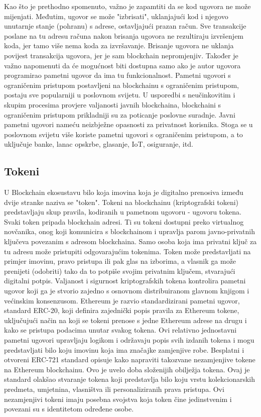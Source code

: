 \documentclass[times, utf8, diplomski]{fer}
\begin{document}
Kao što je prethodno spomenuto, važno je zapamtiti da se kod ugovora ne može mijenjati. Međutim, ugovor se može "izbrisati", uklanjajući kod i njegovo unutarnje stanje (pohranu) s adrese, ostavljajući prazan račun. Sve transakcije poslane na tu adresu računa nakon brisanja ugovora ne rezultiraju izvršenjem koda, jer tamo više nema koda za izvršavanje. Brisanje ugovora ne uklanja povijest transakcija ugovora,  jer je sam blockchain nepromjenjiv. Također je važno napomenuti da će mogućnost biti dostupna samo ako je autor ugovora programirao pametni ugovor da ima tu funkcionalnost.
Pametni ugovori s ograničenim pristupom postavljeni na blockchainu s ograničenim pristupom, postaju sve popularniji u poslovnom svijetu. U usporedbi s neučinkovitim i skupim procesima provjere valjanosti javnih blockchaina, blockchaini s ograničenim pristupom prikladniji su za poticanje poslovne suradnje. Javni pametni ugovori nameću neizbježne opasnosti za privatnost korisnika. Stoga se u poslovnom svijetu više koriste pametni ugovori s ograničenim pristupom, a to uključuje banke, lanac opskrbe, glasanje, IoT, osiguranje, itd. \cite{ethereum-smart-contract}

\subsection{Tokeni}

U Blockchain ekosustavu bilo koja imovina koja je digitalno prenosiva između dvije stranke naziva se "token". Tokeni na blockchainu (kriptografski tokeni) predstavljaju skup pravila, kodiranih u pametnom ugovoru - ugovoru tokena. Svaki token pripada blockchain adresi. Ti su tokeni dostupni preko virtualnog novčanika, onog koji komunicira s blockchainom i upravlja parom javno-privatnih ključeva povezanim s adresom blockchaina. Samo osoba koja ima privatni ključ za tu adresu može pristupiti odgovarajućim tokenima. Token može predstavljati na primjer imovinu, pravo pristupa ili pak glas na izborima, a vlasnik ga može prenijeti (odobriti) tako da to potpiše svojim privatnim ključem, stvarajući digitalni potpis. Valjanost i sigurnost kriptografskih tokena kontrolira pametni ugovor koji ga je stvorio zajedno s osnovnom distribuiranom glavnom knjigom i većinskim konsenzusom.
Ethereum je razvio standardizirani pametni ugovor, standard ERC-20, koji definira zajednički popis pravila za Ethereum tokene, uključujući način na koji se tokeni prenose s jedne Ethereum adrese na drugu i kako se pristupa podacima unutar svakog tokena. Ovi relativno jednostavni pametni ugovori upravljaju logikom i održavaju popis svih izdanih tokena i mogu predstavljati bilo koju imovinu koja ima značajke zamjenjive robe. \cite{erc20}
Besplatni i otvoreni ERC-721 standard opisuje kako napraviti takozvane nezamjenjive tokene na Ethereum blockchainu. Ovo je uvelo doba složenijih obilježja tokena.  Ovaj je standard olakšao stvaranje tokena koji predstavlja bilo koju vrstu kolekcionarskih predmeta, umjetnina, vlasništva ili personaliziranih prava pristupa. Ovi nezamjenjivi tokeni imaju posebna svojstva koja token čine jedinstvenim i povezani su s identitetom određene osobe.\cite{erc721}
\end{document}
